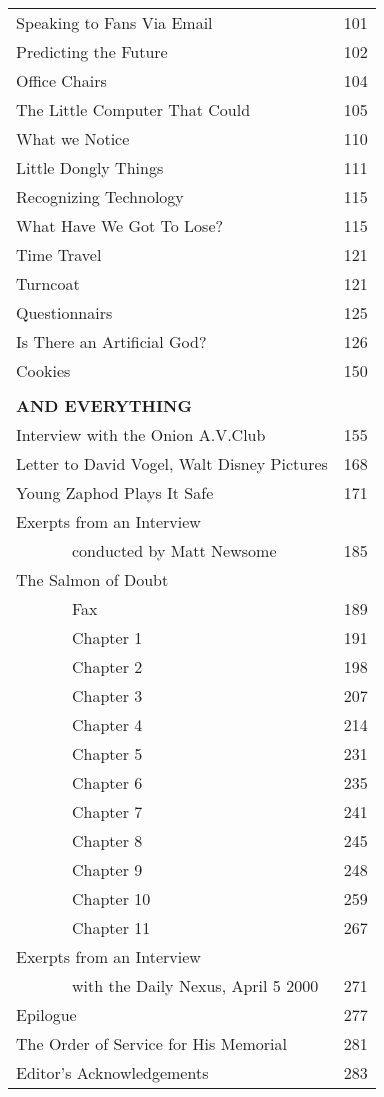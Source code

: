 \documentclass[a4paper,landscape]{article}
\begin{document}
\begin{tabular}{p{6.5cm}|p{1cm}}
\\
Speaking to Fans Via Email&101\\
Predicting the Future&102\\
Office Chairs&104\\
The Little Computer That Could&105\\
What we Notice&110\\
Little Dongly Things&111\\
Recognizing Technology&115\\
What Have We Got To Lose?&115\\
Time Travel&121\\
Turncoat&121\\
Questionnairs&125\\
Is There an Artificial God?&126\\
Cookies&150\\
\hline
\\
{\bf AND EVERYTHING}\\
Interview with the Onion A.V.Club&155\\
Letter to David Vogel, Walt Disney Pictures&168\\
Young Zaphod Plays It Safe&171\\
Exerpts from an Interview \\
\ \ \ \ \ \ \ conducted by Matt Newsome&185\\
The Salmon of Doubt\\
\ \ \ \ \ \ \ Fax&189\\
\ \ \ \ \ \ \ Chapter 1&191\\
\ \ \ \ \ \ \ Chapter 2&198\\
\ \ \ \ \ \ \ Chapter 3&207\\
\ \ \ \ \ \ \ Chapter 4&214\\
\ \ \ \ \ \ \ Chapter 5&231\\
\ \ \ \ \ \ \ Chapter 6&235\\
\ \ \ \ \ \ \ Chapter 7&241\\
\ \ \ \ \ \ \ Chapter 8&245\\
\ \ \ \ \ \ \ Chapter 9&248\\
\ \ \ \ \ \ \ Chapter 10&259\\
\ \ \ \ \ \ \ Chapter 11&267\\
Exerpts from an Interview \\
\ \ \ \ \ \ \ with the Daily Nexus, April 5 2000&271\\
Epilogue&277\\
The Order of Service for His Memorial&281\\
Editor's Acknowledgements &283\\


\end{tabular}
\end{document}
